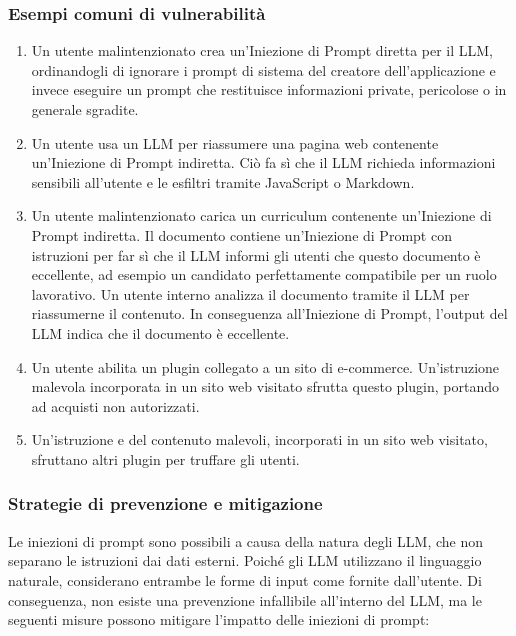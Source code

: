 \documentclass[
]{article}
\providecommand{\tightlist}{%
  \setlength{\itemsep}{0pt}\setlength{\parskip}{0pt}}
\begin{document}
\subsubsection{Esempi comuni di
vulnerabilità}\label{esempi-comuni-di-vulnerabilituxe0}

\begin{enumerate}
\def\labelenumi{\arabic{enumi}.}
\tightlist
\item
  Un utente malintenzionato crea un'Iniezione di Prompt diretta per il
  LLM, ordinandogli di ignorare i prompt di sistema del creatore
  dell'applicazione e invece eseguire un prompt che restituisce
  informazioni private, pericolose o in generale sgradite.
\item
  Un utente usa un LLM per riassumere una pagina web contenente
  un'Iniezione di Prompt indiretta. Ciò fa sì che il LLM richieda
  informazioni sensibili all'utente e le esfiltri tramite JavaScript o
  Markdown.
\item
  Un utente malintenzionato carica un curriculum contenente un'Iniezione
  di Prompt indiretta. Il documento contiene un'Iniezione di Prompt con
  istruzioni per far sì che il LLM informi gli utenti che questo
  documento è eccellente, ad esempio un candidato perfettamente
  compatibile per un ruolo lavorativo. Un utente interno analizza il
  documento tramite il LLM per riassumerne il contenuto. In conseguenza
  all'Iniezione di Prompt, l'output del LLM indica che il documento è
  eccellente.
\item
  Un utente abilita un plugin collegato a un sito di e-commerce.
  Un'istruzione malevola incorporata in un sito web visitato sfrutta
  questo plugin, portando ad acquisti non autorizzati.
\item
  Un'istruzione e del contenuto malevoli, incorporati in un sito web
  visitato, sfruttano altri plugin per truffare gli utenti.
\end{enumerate}

\subsubsection{Strategie di prevenzione e
mitigazione}\label{strategie-di-prevenzione-e-mitigazione}

Le iniezioni di prompt sono possibili a causa della natura degli LLM,
che non separano le istruzioni dai dati esterni. Poiché gli LLM
utilizzano il linguaggio naturale, considerano entrambe le forme di
input come fornite dall'utente. Di conseguenza, non esiste una
prevenzione infallibile all'interno del LLM, ma le seguenti misure
possono mitigare l'impatto delle iniezioni di prompt:
\end{document}
